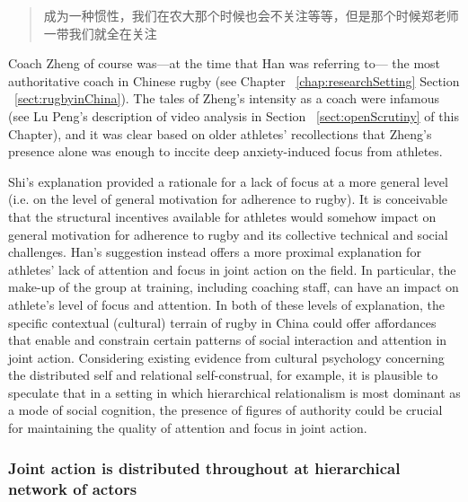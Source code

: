 \begin{CJK}{UTF8}{gbsn}
\begin{quotation}
    成为一种惯性，我们在农大那个时候也会不关注等等，但是那个时候郑老师一带我们就全在关注
\end{quotation}

Coach Zheng of course was---at the time that Han was referring to--- the most authoritative coach in Chinese rugby (see Chapter ~\ref{chap:researchSetting} Section ~\ref{sect:rugbyinChina}). The tales of Zheng's intensity as a coach were infamous (see Lu Peng's description of video analysis in Section ~\ref{sect:openScrutiny} of this Chapter), and it was clear based on older athletes' recollections that Zheng's presence alone was enough to inccite deep anxiety-induced focus from athletes.

Shi's explanation provided a rationale for a lack of focus at a more general level (i.e. on the level of general motivation for adherence to rugby). It is conceivable that the structural incentives available for athletes would somehow impact on general motivation for adherence to rugby and its collective technical and social challenges.  Han's suggestion instead offers a more proximal explanation for athletes' lack of attention and focus in joint action on the field. In particular, the make-up of the group at training, including coaching staff, can have an impact on athlete's level of focus and attention.
In both of these levels of explanation, the specific contextual (cultural) terrain of rugby in China could offer affordances that enable and constrain certain patterns of social interaction and attention in joint action.  Considering existing evidence from cultural psychology concerning the distributed self and relational self-construal, for example, it is plausible to speculate that in a setting in which hierarchical relationalism is most dominant as a mode of social cognition, the presence of figures of authority could be crucial for maintaining the quality of attention and focus in joint action.

\subsubsection{Joint action is distributed throughout at hierarchical network of actors\label{sect:JAdistributedHierarchy}}


\end{CJK}
